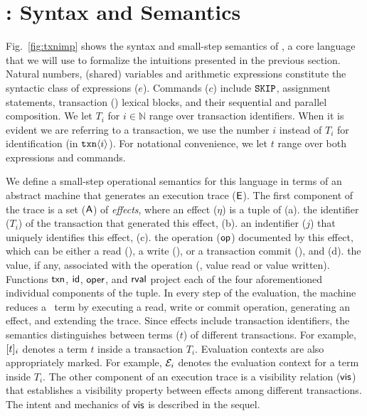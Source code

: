 \section{\txnimp: Syntax and Semantics}
\label{sec:opsem}

\label{sec:syntax}



Fig.~\ref{fig:txnimp} shows the syntax and small-step semantics of
\txnimp, a core language that we will use to formalize the intuitions
presented in the previous section. Natural numbers, (shared) variables
and arithmetic expressions constitute the syntactic class of
expressions ($e$).  Commands ($c$) include ${\tt SKIP}$, assignment
statements, transaction () lexical blocks, and their sequential
and parallel composition. We let $T_i$ for $i \in \mathbb{N}$ range
over transaction identifiers. When it is evident we are referring to a
transaction, we use the number $i$ instead of $T_i$ for identification
(\eg in ${\tt txn}\langle i \rangle$). For notational convenience, we
let $t$ range over both expressions and commands.

We define a small-step operational semantics for this language in
terms of an abstract machine that generates an execution trace ($\textsf{E}$).
The first component of the trace is a set ($\textsf{A}$) of \emph{effects},
where an effect ($\eta$) is a tuple of (a). the identifier ($T_i$) of
the transaction that generated this effect, (b). an indentifier ($j$)
that uniquely identifies this effect, (c). the operation ($\textsf{op}$)
documented by this effect, which can be either a read (), a
write (), or a transaction commit (), and (d). the
value, if any, associated with the operation (\eg, value read or value
written). Functions $\textsf{txn}$, $\textsf{id}$, $\textsf{oper}$, and $\textsf{rval}$ project each
of the four aforementioned individual components of the tuple.
In every step of the evaluation, the machine reduces a \txnimp\ term
by executing a read, write or commit operation, generating an effect,
and extending the trace. Since effects include transaction
identifiers, the semantics distinguishes between terms ($t$) of
different transactions. For example, $\lbrack t \rbrack_i$ denotes a term $t$
inside a transaction $T_i$.  Evaluation contexts are also
appropriately marked. For example, $\mathcal{E}_i$ denotes the evaluation
context for a term inside $T_i$. The other component of an execution
trace is a visibility relation ($\textsf{vis}$) that establishes a visibility
property between effects among different transactions. The intent and
mechanics of $\textsf{vis}$ is described in the sequel.

